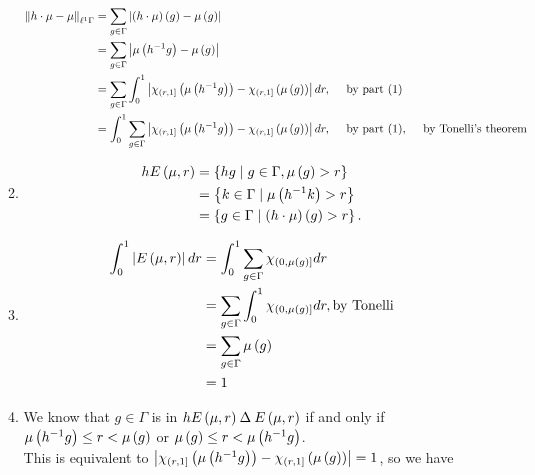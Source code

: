 \documentclass[a4paper,10pt]{report}
\begin{document}
\begin{enumerate}
\begin{enumerate}
                  \begin{align*}
                    \NK h \cdot \mu - \mu \KN_{\ell^1 \Gamma}%
                    &= \sum_{g \in \Gamma} \MG \E h \cdot \mu \R \E g \R - \mu \E g \R \GM\\
                    &= \sum_{g \in \Gamma} \MG \mu \E h^{-1} g \R - \mu \E g \R \GM\\
                    &= \sum_{g \in \Gamma} \I_0^1 \MG \chi_{\E r , 1 \FD} \E \mu \E h^{-1} g \R \R - \chi_{\E r , 1 \FD} \E \mu \E g \R \R \GM dr, \quad \te{ by part (1)}\\
                    &= \I_0^1 \sum_{g \in \Gamma} \MG \chi_{\E r , 1 \FD} \E \mu \E h^{-1} g \R \R - \chi_{\E r , 1 \FD} \E \mu \E g \R \R \GM dr, \quad \te{ by part (1)}, \quad \te{ by Tonelli's theorem}\\
                  \end{align*}
		\item

                  \begin{align*}
                    h E \E \mu , r \R%
                    &= \ER h g \mid g \in \Gamma, \mu \E g \R > r \RE\\
                    &= \ER k \in \Gamma \mid \mu \E h^{-1} k \R > r \RE\\
                    &= \ER g \in \Gamma \mid \E h \cdot \mu \R \E g \R > r \RE.
                  \end{align*}

		\item

                  \begin{align*}
                    \I_0^1 \MG E \E \mu , r \R \GM dr%
                    &= \I_0^1 \sum_{g \in \Gamma} \chi_{\E 0 , \mu \E g \R \FD} dr\\
                    &= \sum_{g \in \Gamma} \I_0^1 \chi_{\E 0 , \mu \E g \R \FD} dr, \te{by Tonelli}\\
                    &= \sum_{g \in \Gamma} \mu \E g \R\\
                    &= 1
                  \end{align*}

		\item We know that $g \in \Gamma$ is in $h E \left( \mu , r \right) \mathbin{\Delta} E \left( \mu , r \right)$ if and only if $\mu \left( h^{-1} g \right) \leq r < \mu \left( g \right)$ or $\mu \left( g \right) \leq r < \mu \left( h^{-1} g \right)$.\\
                  This is equivalent to $\left| \chi_{\left( r , 1 \right]} \left( \mu \left( h^{-1} g \right) \right) - \chi_{\left( r , 1 \right]} \left( \mu \left( g \right) \right) \right| = 1$, so we have


\end{enumerate}
\end{enumerate}
\end{document}
